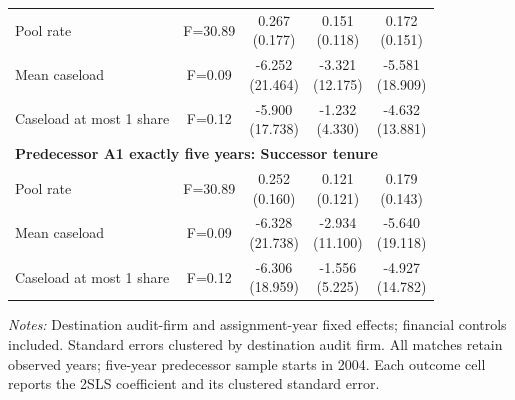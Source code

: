 \documentclass[10pt]{article}
\begin{document}
\begin{minipage}{19cm}
\begin{threeparttable}
\begin{tabular}{p{}cccc}
Pool rate & F=30.89 & \shortstack{0.267\\(0.177)} & \shortstack{0.151\\(0.118)} & \shortstack{0.172\\(0.151)} \\
Mean caseload & F=0.09 & \shortstack{-6.252\\(21.464)} & \shortstack{-3.321\\(12.175)} & \shortstack{-5.581\\(18.909)} \\
Caseload at most 1 share & F=0.12 & \shortstack{-5.900\\(17.738)} & \shortstack{-1.232\\(4.330)} & \shortstack{-4.632\\(13.881)} \\
\multicolumn{5}{l}{\textbf{Predecessor A1 exactly five years: Successor tenure}} \\
Pool rate & F=30.89 & \shortstack{0.252\\(0.160)} & \shortstack{0.121\\(0.121)} & \shortstack{0.179\\(0.143)} \\
Mean caseload & F=0.09 & \shortstack{-6.328\\(21.738)} & \shortstack{-2.934\\(11.100)} & \shortstack{-5.640\\(19.118)} \\
Caseload at most 1 share & F=0.12 & \shortstack{-6.306\\(18.959)} & \shortstack{-1.556\\(5.225)} & \shortstack{-4.927\\(14.782)} \\
\bottomrule
\end{tabular}
\begin{tablenotes}\fontsize{9}{11}\selectfont
\item \raggedright \fontsize{9}{11}\selectfont \textit{Notes:} Destination audit-firm and assignment-year fixed effects; financial controls included. Standard errors clustered by destination audit firm. All matches retain observed years; five-year predecessor sample starts in 2004. Each outcome cell reports the 2SLS coefficient and its clustered standard error.
\end{tablenotes}
\end{threeparttable}

\end{minipage}
\end{document}
